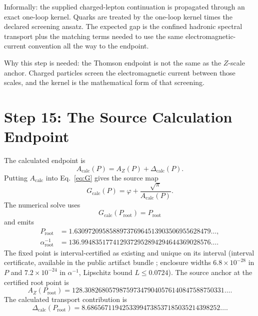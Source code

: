 \documentclass[11pt]{article}
\theoremstyle{remark}
\newcommand{\alphainv}{\alpha^{-1}}
\newcommand{\AZ}{A_Z}
\newcommand{\Dcalc}{\Delta_{\mathrm{calc}}}
\begin{document}
Informally: the supplied charged-lepton continuation is propagated through an
exact one-loop kernel. Quarks are treated by the one-loop kernel times the
declared screening ansatz. The expected gap is the confined hadronic spectral
transport plus the matching terms needed to use the same electromagnetic-current convention all the way to the endpoint.

Why this step is needed: the Thomson endpoint is not the same as the \(Z\)-scale anchor. Charged particles screen the electromagnetic current between those scales, and the kernel is the mathematical form of that screening.

\section{Step 15: The Source Calculation Endpoint}

The calculated endpoint is
\begin{equation}
A_{\mathrm{calc}}(P)
=
\AZ(P)+\Dcalc(P).
\label{eq:Acalc}
\end{equation}
Putting \(A_{\mathrm{calc}}\) into Eq.~\eqref{eq:G} gives the source map
\begin{equation}
G_{\mathrm{calc}}(P)
=
\varphi+\frac{\sqrt\pi}{A_{\mathrm{calc}}(P)}.
\label{eq:Gcalc}
\end{equation}
The numerical solve uses
\begin{equation}
G_{\mathrm{calc}}(P_{\mathrm{root}})=P_{\mathrm{root}}
\label{eq:Proot}
\end{equation}
and emits
\begin{align}
P_{\mathrm{root}}
&=
1.630972095858897376964513903506955628479\ldots,
\label{eq:Prootnum}\\
\alphainv_{\mathrm{root}}
&=
136.9948351774129372952894294644369028576\ldots.
\label{eq:alpharoot}
\end{align}
The fixed point is interval-certified as
existing and unique on its interval (interval certificate,
available in the public artifact bundle \cite{oph-code};
enclosure widths \(6.8\times10^{-28}\) in \(P\) and \(7.2\times10^{-24}\) in
\(\alpha^{-1}\), Lipschitz bound \(L\le0.0724\)).
The source anchor at the certified root point is
\begin{equation}
\AZ(P_{\mathrm{root}})
=
128.3082680579875973479040576140847588750331\ldots.
\label{eq:AZroot}
\end{equation}
The calculated transport contribution is
\begin{equation}
\Dcalc(P_{\mathrm{root}})
=
8.68656711942533994738537185035214398252\ldots.
\label{eq:Dcalcroot}
\end{equation}
\end{document}
